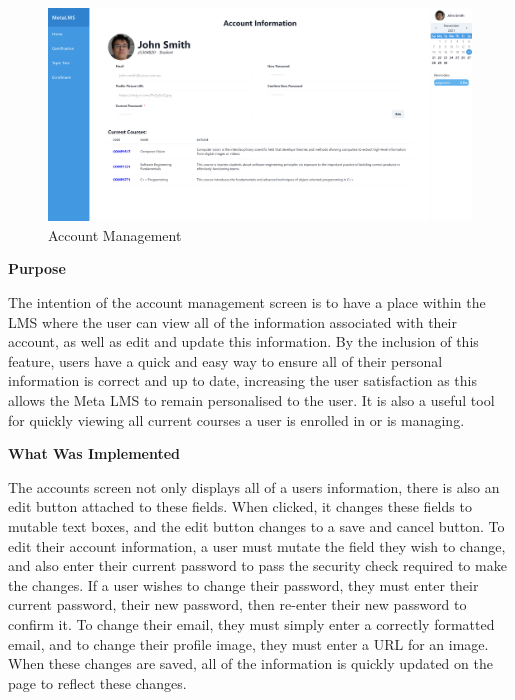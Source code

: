 \begin{figure}[h!]
    \centering
    \includegraphics[scale=0.1]{images/accounts-account-management.png}
    \caption{Account Management}
\end{figure}

\textbf{Purpose}

The intention of the account management screen is to have a place within the LMS where the user can view all of the information associated with their account, as well as edit and update this information. By the inclusion of this feature, users have a quick and easy way to ensure all of their personal information is correct and up to date, increasing the user satisfaction as this allows the Meta LMS to remain personalised to the user. It is also a useful tool for quickly viewing all current courses a user is enrolled in or is managing.

\textbf{What Was Implemented}

The accounts screen not only displays all of a users information, there is also an edit button attached to these fields. When clicked, it changes these fields to mutable text boxes, and the edit button changes to a save and cancel button. To edit their account information, a user must mutate the field they wish to change, and also enter their current password to pass the security check required to make the changes. If a user wishes to change their password, they must enter their current password, their new password, then re-enter their new password to confirm it. To change their email, they must simply enter a correctly formatted email, and to change their profile image, they must enter a URL for an image. When these changes are saved, all of the information is quickly updated on the page to reflect these changes. 

